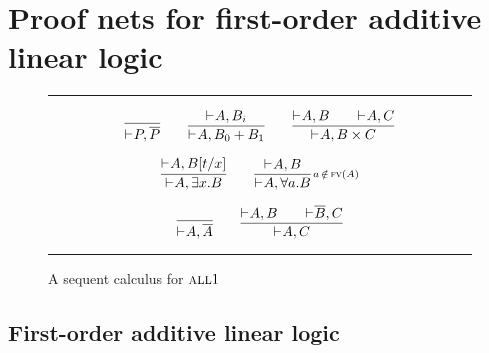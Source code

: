 \documentclass{article}
\theoremstyle{definition}
\theoremstyle{plain}
\newcommand\all{\textsc{all}}
\newcommand\+{+}
\renewcommand\*{\times}
\newcommand\dual[1]{\overline{#1}}
\newcommand\seq[3][]{{\vdash_{#1}}#2,#3}
\begin{document}
    
    
 




\section{Proof nets for first-order additive linear logic}


\begin{figure}
\hrule
\par\bigskip
\[
	\infer{\seq P{\dual P}}{}
\qquad
	\infer{\seq A{B_0\+B_1}}{\seq A{B_i}}
\qquad
	\infer{\seq A{B\*C}}{\seq AB && \seq AC}
\]
\par
\[
	\infer{\seq A{\exists x.B}}{\seq A{B[t/x]}}
\qquad
	\infer[\!\!\scriptstyle{a\,\notin\,\textsc{fv}(A)}]{\seq A{\forall a.B}}{\seq AB}
\]
\par
\[
	\infer{\seq A{\dual A}}{}
\qquad
	\infer{\seq AC}{\seq AB && \seq{\dual B}C}
\]
\par\bigskip\hrule
\caption{A sequent calculus for $\all1$}
\label{fig:sequent calculus}
\end{figure}



\subsection{First-order additive linear logic}
\end{document}
